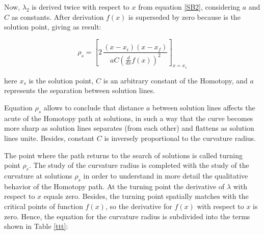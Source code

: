 \documentclass[journal,twocolumn]{IEEEtran}
\begin{document}
Now, $\lambda_2$ is derived twice with respect to $x$ from equation \ref{SB2}, considering $a$ and $C$ as constants. After derivation $f(x)$ is superseded by zero because is the solution point, giving as result:

\begin{displaymath}
\rho_{s}=\left[2\,{\frac {\left( x-x_i \right)  \left( x-x_f \right) }{  aC
   \left( {\frac {d}{dx}}f \left( x \right) \right)^{2}}}\right]_{x=x_s}
\end{displaymath}

here $x_s$ is the solution point, $C$ is an arbitrary constant of the Homotopy, and $a$ represents the separation between solution lines.

Equation $\rho_{s}$ allows to conclude that distance $a$ between solution lines affects the acute of the Homotopy path at solutions, in such a way that the curve becomes more sharp as solution lines separates (from each other) and flattens as solution lines unite. Besides, constant $C$ is inversely proportional to the curvature radius.

The point where the path returns to the search of solutions is called turning point $\rho_r$. The study of the curvature radius is completed with the study of the curvature at solutions $\rho_s$ in order to understand in more detail the qualitative behavior of the Homotopy path. At the turning point the derivative of $\lambda$ with respect to $x$ equals zero. Besides, the turning point spatially matches with the critical points of function $f(x)$, so the derivative for $f(x)$ with respect to $x$ is zero. Hence, the equation for the curvature radius is subdivided into the terms shown in Table \ref{ttt}:
\end{document}
